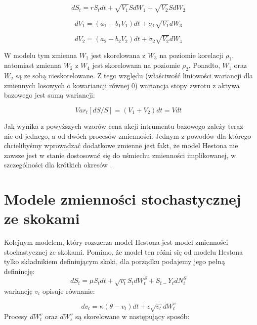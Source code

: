 \documentclass{pracamgr}
\begin{document}
\begin{equation}
dS_t  = r S_t dt + \sqrt{V_1} S dW_1 + \sqrt{V_2} S dW_2
\end{equation} 

\begin{equation}
dV_1  = (a_1 - b_1 V_1)dt + \sigma_1 \sqrt{V_1} dW_3 
\end{equation}

\begin{equation}
dV_2  = (a_2 - b_2 V_2)dt + \sigma_2 \sqrt{V_2} dW_4 
\end{equation}

W modelu tym zmienna $W_1$ jest skorelowana z $W_3$ na poziomie korelacji $\rho_1$, natomiast
zmienna $W_2$ z $W_4$ jest skorelowana na poziomie $\rho_2$. Ponadto, $W_1$ oraz $W_2$ są ze sobą nieskorelowane. Z tego względu (właściwość
liniowości wariancji dla zmiennych losowych o kowariancji równej $0$) wariancja stopy zwrotu z aktywa
bazowego jest sumą wariancji:

\begin{equation}
  Var_t[dS/S] = (V_1 + V_2)dt = Vdt
\end{equation}

Jak wynika z powyższych wzorów cena akcji intrumentu bazowego zależy teraz nie od jednego, a od 
dwóch procesów zmienności.
Jednym z powodów dla którego chcielibyśmy wprowadzać dodatkowe zmienne jest fakt, że model
Hestona nie zawsze jest w stanie dostosować się do uśmiechu zmienności implikowanej, w szczególności 
dla krótkich okresów \cite{HestonExtensions}.


\section{Modele zmienności stochastycznej ze skokami} %
\label{sec:modele_zmienno_ci_stochastycznej_ze_skokami}
 
Kolejnym modelem, który rozszerza model Hestona jest model zmienności stochastycznej ze skokami.
Pomimo, że model ten różni się od modelu Hestona tylko składnikiem definiującym skoki, dla
porządku podajemy jego pełną definincję:
\begin{equation}
dS_t  = \mu S_t dt + \sqrt{v_t} S_t dW^S_t + S_{t-} Y_t dN_t^S
\end{equation}
wariancję $v_t$ opisuje równanie: 

\begin{equation}
dv_t  = \kappa (\theta - v_t)dt + \epsilon \sqrt{v_t} dW_t^v 
\end{equation}
Procesy $dW_t^v$ oraz $dW_s^v$ są skorelowane w następujący sposób:
\end{document}
